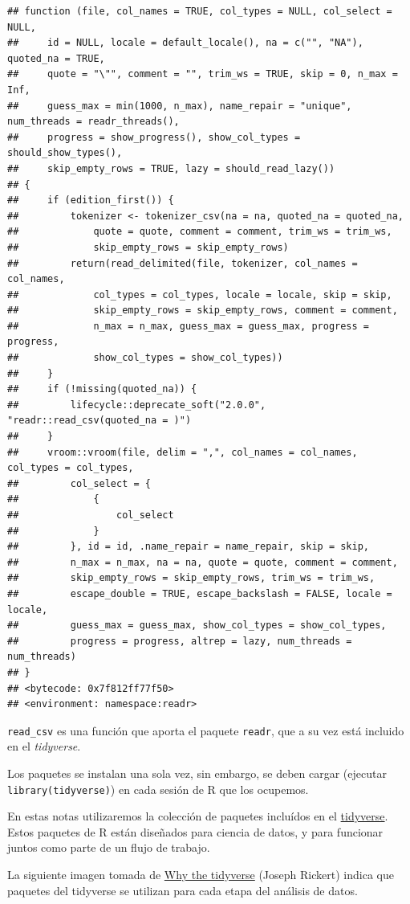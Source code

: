 \documentclass[
]{book}
\begin{document}
\begin{verbatim}
## function (file, col_names = TRUE, col_types = NULL, col_select = NULL, 
##     id = NULL, locale = default_locale(), na = c("", "NA"), quoted_na = TRUE, 
##     quote = "\"", comment = "", trim_ws = TRUE, skip = 0, n_max = Inf, 
##     guess_max = min(1000, n_max), name_repair = "unique", num_threads = readr_threads(), 
##     progress = show_progress(), show_col_types = should_show_types(), 
##     skip_empty_rows = TRUE, lazy = should_read_lazy()) 
## {
##     if (edition_first()) {
##         tokenizer <- tokenizer_csv(na = na, quoted_na = quoted_na, 
##             quote = quote, comment = comment, trim_ws = trim_ws, 
##             skip_empty_rows = skip_empty_rows)
##         return(read_delimited(file, tokenizer, col_names = col_names, 
##             col_types = col_types, locale = locale, skip = skip, 
##             skip_empty_rows = skip_empty_rows, comment = comment, 
##             n_max = n_max, guess_max = guess_max, progress = progress, 
##             show_col_types = show_col_types))
##     }
##     if (!missing(quoted_na)) {
##         lifecycle::deprecate_soft("2.0.0", "readr::read_csv(quoted_na = )")
##     }
##     vroom::vroom(file, delim = ",", col_names = col_names, col_types = col_types, 
##         col_select = {
##             {
##                 col_select
##             }
##         }, id = id, .name_repair = name_repair, skip = skip, 
##         n_max = n_max, na = na, quote = quote, comment = comment, 
##         skip_empty_rows = skip_empty_rows, trim_ws = trim_ws, 
##         escape_double = TRUE, escape_backslash = FALSE, locale = locale, 
##         guess_max = guess_max, show_col_types = show_col_types, 
##         progress = progress, altrep = lazy, num_threads = num_threads)
## }
## <bytecode: 0x7f812ff77f50>
## <environment: namespace:readr>
\end{verbatim}

\texttt{read\_csv} es una función que aporta el paquete \texttt{readr}, que a su vez está incluido en el
\emph{tidyverse}.

Los paquetes se instalan una sola vez, sin embargo, se deben cargar
(ejecutar \texttt{library(tidyverse)}) en cada sesión de R que los ocupemos.

En estas notas utilizaremos la colección de paquetes incluídos en el
\href{https://www.tidyverse.org/}{tidyverse}. Estos paquetes de R están
diseñados para ciencia de datos, y para funcionar juntos como parte de un flujo
de trabajo.

La siguiente imagen tomada de \href{https://rviews.rstudio.com/2017/06/08/what-is-the-tidyverse/}{Why the tidyverse} (Joseph
Rickert) indica que paquetes del tidyverse se utilizan para cada
etapa del análisis de datos.
\end{document}
